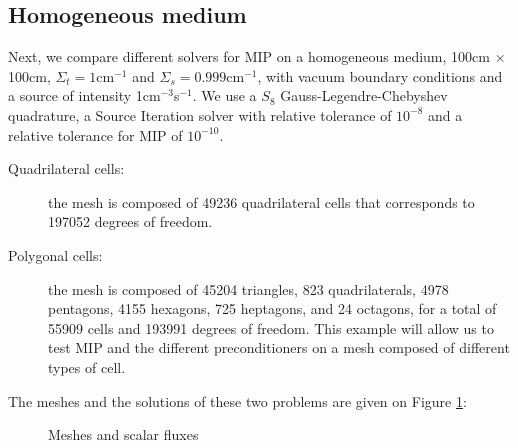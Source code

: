 \subsection{Homogeneous medium}
Next, we compare different solvers for MIP on a homogeneous medium, 100cm $\times$
100cm, $\Sigma_t=1$cm$^{-1}$ and $\Sigma_s=0.999$cm$^{-1}$, with vacuum boundary 
conditions and a source of intensity 1cm$^{-3}$s$^{-1}$. We use a $S_8$
Gauss-Legendre-Chebyshev quadrature, a Source Iteration solver with relative
tolerance of $10^{-8}$ and a relative tolerance for MIP of $10^{-10}$.
\begin{description}
  \item[Quadrilateral cells:] the mesh is composed of 49236 quadrilateral cells
    that corresponds to 197052 degrees of freedom.
  \item[Polygonal cells:] the mesh is composed of 45204 triangles, 823 
    quadrilaterals, 4978 pentagons, 4155 hexagons, 725 heptagons, and 24 
    octagons, for a total of 55909 cells and 193991 degrees of freedom. This 
    example will allow us to test MIP and the different preconditioners on a 
    mesh composed of different types of cell.
\end{description}
The meshes and the solutions of these two problems are given on Figure
\ref{fig_meshes_phi}:
\begin{figure}[H]
\centering    
{}
\caption{Meshes and scalar fluxes}
\label{fig_meshes_phi}
\end{figure}

